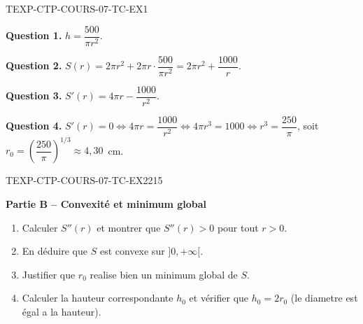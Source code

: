 \begin{corrige}{TEXP-CTP-COURS-07-TC-EX1}

\textbf{Question 1.} $h = \dfrac{500}{\pi r^2}$.

\textbf{Question 2.} $S(r) = 2\pi r^2 + 2\pi r \cdot \dfrac{500}{\pi r^2} = 2\pi r^2 + \dfrac{1000}{r}$.


\textbf{Question 3.} $S'(r) = 4\pi r - \dfrac{1000}{r^2}$.

\textbf{Question 4.} $S'(r) = 0 \iff 4\pi r = \dfrac{1000}{r^2} \iff 4\pi r^3 = 1000 \iff r^3 = \dfrac{250}{\pi}$, soit $r_0 = \left(\dfrac{250}{\pi}\right)^{1/3} \approx 4{,}30$~cm.

\end{corrige}

\bigskip


\begin{exercice}{TEXP-CTP-COURS-07-TC-EX2}{2}{15}

\textbf{Partie B -- Convexité et minimum global}

\begin{enumerate}
  \item Calculer $S''(r)$ et montrer que $S''(r) > 0$ pour tout $r > 0$.
  \item En déduire que $S$ est convexe sur $]0, +\infty[$.
  \item Justifier que $r_0$ realise bien un minimum global de $S$.
  \item Calculer la hauteur correspondante $h_0$ et vérifier que $h_0 = 2r_0$ (le diametre est égal a la hauteur).
\end{enumerate}

\end{exercice}

